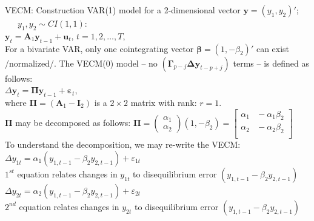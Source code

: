 \documentclass[usenames,dvipsnames]{beamer}
\begin{document}
\begin{frame}{VECM: Construction}
\footnotesize
VAR(1) model for a 2-dimensional vector $\bm{y} = (y_1, y_2)'$; ~~~$y_1, y_2 \sim CI(1,1)$:\\
\vspace{0.2cm}
$\bm{y}_t = \bm{A}_1 \bm{y}_{t-1} + \bm{u}_t$, \qquad $t=1,2, \dots, T$, \\
\bigskip
For a bivariate VAR, only one cointegrating vector  $\bm{\beta}=(1, -\beta_2)'$  can exist /normalized/. The VECM(0) model -- no $(\bm{\Gamma}_{p-j} \bm{\Delta} \bm{y}_{t-p+j})$ terms -- is defined as follows:\\
\medskip
$\Delta\bm{y}_t = \bm{\Pi} \bm{y}_{t-1} + \bm{\varepsilon}_t$, \\
\medskip
where $\bm{\Pi}= (\bm{A}_1-\bm{I}_2)$ is a $2 \times 2$ matrix with rank: $r=1$.\\
\hspace*{8mm} $\bm{\Pi}$ may be decomposed as follows: $\bm{\Pi} \!=\! \begin{pmatrix}
\alpha_1 \\ \alpha_2 
\end{pmatrix} \!
\left( 1, -\beta_2 \right) \! = \!\!
\begin{bmatrix}
\alpha_1 & \!\!  -\alpha_1 \beta_2 \\ 
\alpha_2 & \!\! -\alpha_2 \beta_2 \\
\end{bmatrix}$ \\
\medskip
To understand the decomposition, we may re-write the VECM: \\
\medskip
$\Delta y_{1t} = \alpha_1 (y_{1,t-1} - \beta_2 y_{2,t-1}) + \varepsilon_{1t}$ \\ 
\vspace{0.1cm}
$1^{st}$ equation relates changes in $y_{1t}$ to  disequilibrium error $(y_{1,t-1} \! - \! \beta_2 y_{2,t-1})$\\
\vspace{0.2cm}
$\Delta y_{2t} = \alpha_2 (y_{1,t-1} - \beta_2 y_{2,t-1}) + \varepsilon_{2t}$ \\ 
\vspace{0.1cm}
$2^{nd}$ equation relates changes in $y_{2t}$ to disequilibrium error $(y_{1,t-1} \! - \! \beta_2 y_{2,t-1})$
\end{frame}
\end{document}

